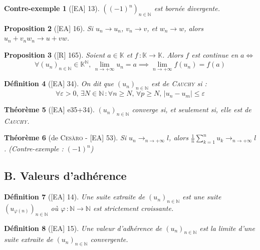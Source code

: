 \documentclass[10pt, a4paper, parskip=full, twoside, twocolumn]{report}
\newtheorem{definition}{Définition}
\newtheorem{theorem}[definition]{Théorème}
\newtheorem{proposition}[definition]{Proposition}
\newtheorem{cexample}[definition]{Contre-exemple}
\newcommand{\IN}{\mathbb{N}}
\newcommand{\IK}{\mathbb{K}}
\begin{document}
\begin{cexample}[\textnormal{[EA] 13}]
	$\left((-1)^n\right)_{n\in\IN}$ est bornée divergente.
\end{cexample}

\begin{proposition}[\textnormal{[EA] 16}]
	Si $u_n\to u_n$, $v_n\to v$, et $w_n\to w$, alors $u_n+v_nw_n\to u+vw$.
\end{proposition}

\begin{proposition}[\textnormal{[R] 165}]
	Soient $a\in\IK$ et $f\,\colon \IK\to\IK$. Alors $f$ est continue en $a \iff$
	$$\forall \left(u_n\right)_{n\in\IN} \in \IK^{\IN},\,\lim_{n\to +\infty} u_n = a \implies \lim_{n\to +\infty} f(u_n) = f(a)$$
\end{proposition}

\begin{definition}[\textnormal{[EA] 34}]
	On dit que $\left(u_n\right)_{n\in\IN}$ est \emph{de \textsc{Cauchy}} si :
	$$\forall \varepsilon > 0,\, \exists N\in \IN\,\colon \forall n\geq N,\, \forall p\geq N,\, \vert u_n - u_m\vert \leq \varepsilon$$
\end{definition}

\begin{theorem}[\textnormal{[EA] e35+34}]
	$\left(u_n\right)_{n\in\IN}$ converge si, et seulement si, elle est de \textsc{Cauchy}.
\end{theorem}

\begin{theorem}[de \textsc{Cesàro} - \textnormal{[EA] 53}]
	Si $u_n\longrightarrow_{n\to +\infty} l$, alors $\frac{1}{n}\sum_{k=1}^{n} u_k \longrightarrow_{n\to +\infty} l$. (Contre-exemple :  $(-1)^n$)
\end{theorem}

\subsection*{B. Valeurs d'adhérence}
\begin{definition}[\textnormal{[EA] 14}]
	Une \emph{suite extraite de $\left(u_n\right)_{n\in\IN}$} est une suite $\left(u_{\varphi(n)}\right)_{n\in\IN}$ où $\varphi\,\colon\IN\to\IN$ est strictement croissante.
\end{definition}

\begin{definition}[\textnormal{[EA] 15}]
	Une \emph{valeur d'adhérence} de $\left(u_n\right)_{n\in\IN}$ est la limite d'une suite extraite de $\left(u_n\right)_{n\in\IN}$ convergente.
\end{definition}
\end{document}
